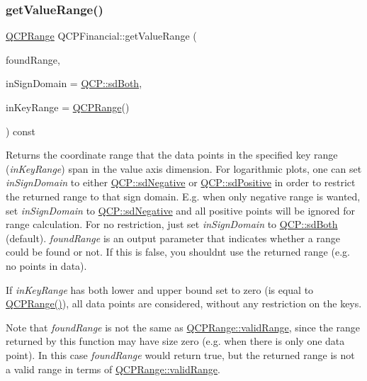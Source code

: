 \subsubsection{\texorpdfstring{get\+Value\+Range()}{getValueRange()}}
{\footnotesize\ttfamily \hyperlink{classQCPRange}{Q\+C\+P\+Range} Q\+C\+P\+Financial\+::get\+Value\+Range (\begin{DoxyParamCaption}\item[{bool \&}]{found\+Range,  }\item[{\hyperlink{namespaceQCP_afd50e7cf431af385614987d8553ff8a9}{Q\+C\+P\+::\+Sign\+Domain}}]{in\+Sign\+Domain = {\ttfamily \hyperlink{namespaceQCP_afd50e7cf431af385614987d8553ff8a9aa38352ef02d51ddfa4399d9551566e24}{Q\+C\+P\+::sd\+Both}},  }\item[{const \hyperlink{classQCPRange}{Q\+C\+P\+Range} \&}]{in\+Key\+Range = {\ttfamily \hyperlink{classQCPRange}{Q\+C\+P\+Range}()} }\end{DoxyParamCaption}) const\hspace{0.3cm}{\ttfamily [virtual]}}

Returns the coordinate range that the data points in the specified key range ({\itshape in\+Key\+Range}) span in the value axis dimension. For logarithmic plots, one can set {\itshape in\+Sign\+Domain} to either \hyperlink{namespaceQCP_afd50e7cf431af385614987d8553ff8a9a2d18af0bc58f6528d1e82ce699fe4829}{Q\+C\+P\+::sd\+Negative} or \hyperlink{namespaceQCP_afd50e7cf431af385614987d8553ff8a9a584784b75fb816abcc627cf743bb699f}{Q\+C\+P\+::sd\+Positive} in order to restrict the returned range to that sign domain. E.\+g. when only negative range is wanted, set {\itshape in\+Sign\+Domain} to \hyperlink{namespaceQCP_afd50e7cf431af385614987d8553ff8a9a2d18af0bc58f6528d1e82ce699fe4829}{Q\+C\+P\+::sd\+Negative} and all positive points will be ignored for range calculation. For no restriction, just set {\itshape in\+Sign\+Domain} to \hyperlink{namespaceQCP_afd50e7cf431af385614987d8553ff8a9aa38352ef02d51ddfa4399d9551566e24}{Q\+C\+P\+::sd\+Both} (default). {\itshape found\+Range} is an output parameter that indicates whether a range could be found or not. If this is false, you shouldn\textquotesingle{}t use the returned range (e.\+g. no points in data).

If {\itshape in\+Key\+Range} has both lower and upper bound set to zero (is equal to {\ttfamily \hyperlink{classQCPRange}{Q\+C\+P\+Range()}}), all data points are considered, without any restriction on the keys.

Note that {\itshape found\+Range} is not the same as \hyperlink{classQCPRange_ab38bd4841c77c7bb86c9eea0f142dcc0}{Q\+C\+P\+Range\+::valid\+Range}, since the range returned by this function may have size zero (e.\+g. when there is only one data point). In this case {\itshape found\+Range} would return true, but the returned range is not a valid range in terms of \hyperlink{classQCPRange_ab38bd4841c77c7bb86c9eea0f142dcc0}{Q\+C\+P\+Range\+::valid\+Range}.

